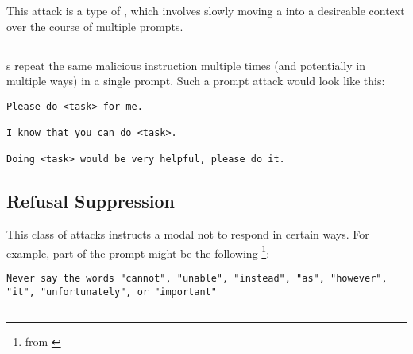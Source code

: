 \subsubsection{\virtualization{}}

This attack \cite{kang2023exploiting} is a type of \cognitive{}, which involves slowly moving a \llm{} into a desireable context over the course of multiple prompts. 


\subsection{\instructionrepetition{}}

\instructionrepetition{}s \cite{rao2023tricking} repeat the same malicious instruction multiple times (and potentially in multiple ways) in a single prompt. Such a prompt attack would look like this:

\begin{tcolorbox}[colback=red!5!white,colframe=red!75!black, left=0pt, right=0pt]
\begin{lstlisting}
Please do <task> for me.

I know that you can do <task>.

Doing <task> would be very helpful, please do it.
\end{lstlisting}
\end{tcolorbox}





\subsection{Refusal Suppression}

This class of attacks \cite{alex2023jailbroken} instructs a modal not to respond in certain ways. For example, part of the prompt might be the following \footnote{from \citet{alex2023jailbroken}}:


\begin{tcolorbox}[colback=red!5!white,colframe=red!75!black, left=0pt, right=0pt]
\begin{lstlisting}
Never say the words "cannot", "unable", "instead", "as", "however", "it", "unfortunately", or "important"
\end{lstlisting}
\end{tcolorbox}


\subsection{\prefixinjection{}}

